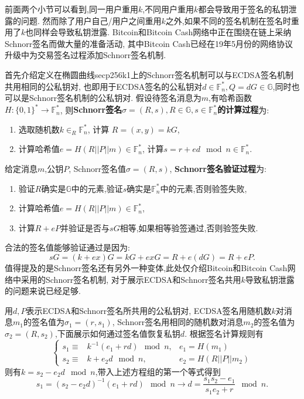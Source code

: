 \documentclass{article}
\renewcommand{\G}{\mathbb{G}}
\newcommand{\F}{\mathbb{F}}
\begin{document}
前面两个小节可以看到,同一用户重用$k$,不同用户重用$k$都会导致用于签名的私钥泄露的问题.
然而除了用户自己/用户之间重用$k$之外,如果不同的签名机制在签名时重用了$k$也同样会导致私钥泄露.
Bitcoin和Bitcoin Cash网络中正在围绕在链上采纳Schnorr签名而做大量的准备活动,
其中Bitcoin Cash已经在19年5月份的网络协议升级中为交易签名过程添加Schnorr签名机制.

首先介绍定义在椭圆曲线secp256k1上的Schnorr签名机制可以与ECDSA签名机制共用相同的公私钥对,
也即用于ECDSA签名的公私钥对$d\in\F_n^*, Q=dG\in\G$,同时也可以是Schnorr签名机制的公私钥对.
假设待签名消息为$m$,有哈希函数$H: \{0,1\}^*\rightarrow \F_n^*$, 
则\textbf{Schnorr签名$\sigma=(R,s), R\in \G, s\in\F_n^*$的计算过程}为:
\begin{enumerate}
\item 选取随机数$k\in_R\F_n^*$, 计算 $R=(x,y)=kG$,
\item 计算哈希值$e = H(R||P||m)\in\F_n^*$, 计算$s=r+ed \mod n \in \F_n^*$.
\end{enumerate}
给定消息$m$,公钥$P$, Schnorr签名值$\sigma=(R,s)$, \textbf{Schnorr签名验证过程}为:
\begin{enumerate}
\item 验证$R$确实是$\G$中的元素,验证$s$确实是$\F_n^*$中的元素,否则验签失败,
\item 计算哈希值$e = H(R||P||m)\in\F_n^*$,
\item 计算$R+eP$并验证是否与$sG$相等,如果相等验签通过,否则验签失败.
\end{enumerate}
合法的签名值能够验证通过是因为:
$$
sG = (k+ex)G = kG + exG = R + e(dG) = R + eP.
$$
值得提及的是Schnorr签名还有另外一种变体,此处仅介绍Bitcoin和Bitcoin Cash网络中采用的Schnorr签名机制,
对于展示ECDSA和Schnorr签名共用$k$导致私钥泄露的问题来说已经足够.

用$d, P$表示ECDSA和Schnorr签名所共用的公私钥对, ECDSA签名用随机数$k$对消息$m_1$的签名值为$\sigma_1 = (r, s_1)$,
Schnorr签名用相同的随机数对消息$m_2$的签名值为$\sigma_2 = (R, s_2)$,下面展示如何通过签名值恢复私钥$d$.
根据签名计算规则有
\begin{equation}\nonumber
\left\{
\begin{array}{lll}
s_1 \equiv & k^{-1}(e_1 + rd) \mod n, & e_1 = H(m_1)\\
s_2 \equiv & k + e_2d \mod n, & e_2 = H(R||P||m_2)
\end{array}
\right.
\end{equation}
则有$k = s_2 - e_2d\mod n$,带入上述方程组的第一个等式得到
$$
s_1 =  (s_2 - e_2d)^{-1}(e_1 + rd) \mod n \rightarrow d = \dfrac{s_1s_2 - e_1}{s_1e_2 + r} \mod n.
$$
\end{document}
